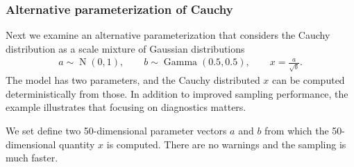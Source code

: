\documentclass[american,]{article}
\DeclareMathOperator{\N}{N}
\DeclareMathOperator{\Gam}{Gamma}
\begin{document}
\hypertarget{alternative-parameterization-of-cauchy}{%
\subsubsection*{Alternative parameterization of
Cauchy}\label{alternative-parameterization-of-cauchy}}

Next we examine an alternative parameterization that considers the
Cauchy distribution as a scale mixture of Gaussian distributions
\begin{align}
  a \sim  \N(0,1), \qquad
  b \sim  \Gam (0.5, 0.5), \qquad
  x =  \frac{a}{\sqrt{b}}.
\end{align}
The model has two parameters, and the Cauchy distributed \(x\) can be
computed deterministically from those. In addition to improved sampling 
performance, the example illustrates that focusing on diagnostics matters.

We set define two 50-dimensional parameter vectors $a$ and $b$ from which
the 50-dimensional quantity $x$ is computed. There are no warnings and
the sampling is much faster.







\end{document}
